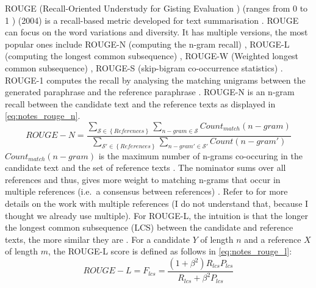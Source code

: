 ROUGE (Recall-Oriented Understudy for Gisting Evaluation \citep{palivela_optimization_2021,lin_rouge_2004}) 
(ranges from 0 to 1 \citep{kurt_pehlivanoglu_comparative_2024}) (2004) 
is a recall-based metric developed for text summarisation \citep{zhou_paraphrase_2021,palivela_optimization_2021,kurt_pehlivanoglu_comparative_2024,lin_rouge_2004}.
ROUGE can focus on the word variations and diversity.
It has multiple versions, the most popular ones include 
ROUGE-N (computing the n-gram recall) \citep{zhou_paraphrase_2021,palivela_optimization_2021,kurt_pehlivanoglu_comparative_2024}, 
ROUGE-L (computing the longest common subsequence) \citep{zhou_paraphrase_2021,palivela_optimization_2021,kurt_pehlivanoglu_comparative_2024}, 
ROUGE-W (Weighted longest common subsequence) \citep{palivela_optimization_2021}, 
ROUGE-S (skip-bigram co-occurrence statistics) \citep{palivela_optimization_2021}.
ROUGE-1 computes the recall by analysing the matching unigrams between the generated paraphrase and the reference paraphrase \citep{palivela_optimization_2021,kurt_pehlivanoglu_comparative_2024}.
ROUGE-N is an n-gram recall between the candidate text and the reference texts \citep{lin_rouge_2004} as displayed in \autoref{eq:notes_rouge_n}.
\begin{equation}
    ROUGE-N = \frac{\sum_{\mathcal{S} \in \left\{ References \right\}}\sum_{n-gram \in\mathcal{S}}Count_{match}(n-gram)}{\sum_{\mathcal{S'} \in \left\{ References \right\}}\sum_{n-gram' \in\mathcal{S'}}Count(n-gram')}
\label{eq:notes_rouge_n}
\end{equation}
$Count_{match}(n-gram)$ is the maximum number of n-grams co-occuring in the candidate text and the set of reference texts \citep{lin_rouge_2004}.
The nominator sums over all references and thus, gives more weight to matching n-grams that occur in multiple references (i.e.\ a consensus between references) \citep{lin_rouge_2004}.
Refer to \citet{lin_rouge_2004} for more details on the work with multiple references (I do not understand that, because I thought we already use multiple).
For ROUGE-L, the intuition is that the longer the longest common subsequence (LCS) between the candidate and reference texts, the more similar they are \citep{lin_rouge_2004}.
For a candidate $Y$ of length $n$ and a reference $X$ of length $m$, the ROUGE-L score is defined as follows in \autoref{eq:notes_rouge_l}:
\begin{equation}
    ROUGE-L = F_{lcs} = \frac{(1 + \beta^2)R_{lcs}P_{lcs}}{R_{lcs} + \beta^2 P_{lcs}}
\label{eq:notes_rouge_l}
\end{equation}
